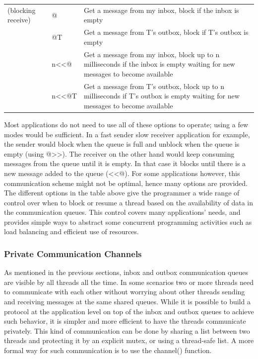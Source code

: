 \begin{flushleft}
\begin{supertabular}{m{0.8920598in}m{0.8643598in}m{4.10186in}}
\centering (blocking receive) &
\centering {\textless}{\textless}@ &
Get a message from my inbox, block if the inbox is empty\\
 &
\centering {\textless}{\textless}@T &
Get a message from T{\textquoteright}s outbox, block if
T{\textquoteright}s outbox is empty\\
 &
\centering n{\textless}{\textless}@ &
Get a message from my inbox, block up to n milliseconds if the inbox is
empty waiting for new messages to become available\\
 &
\centering n{\textless}{\textless}@T &
Get a message from T{\textquoteright}s outbox, block up to n
milliseconds if T{\textquoteright}s outbox is empty waiting for new
messages to become available\\
\end{supertabular}
\end{flushleft}

\bigskip

Most applications do not need to use all of these options to operate;
using a few modes would be sufficient. In a fast sender slow receiver
application for example, the sender would block when the queue is full
and unblock when the queue is empty (using
\textsf{@{\textgreater}{\textgreater}}). The receiver
on the other hand would keep consuming messages from the queue until it
is empty. In that case it blocks until there is a new message added to
the queue (\textsf{{\textless}{\textless}@}). For some
applications however, this communication scheme might not be optimal,
hence many options are provided. The different options in the table
above give the programmer a wide range of control over when to block or
resume a thread based on the availability of data in the communication
queues. This control covers many applications{\textquoteright} needs,
and provides simple ways to abstract some concurrent programming
activities such as load balancing and efficient use of resources.

\subsubsection{Private Communication Channels }

As mentioned in the previous sections, inbox and outbox communication
queues are visible by all threads all the time. In some scenarios two
or more threads need to communicate with each other without worrying
about other threads sending and receiving messages at the same shared
queues. While it is possible to build a protocol at the application
level on top of the inbox and outbox queues to achieve such behavior,
it is simpler and more efficient to have the threads communicate
privately. This kind of communication can be done by sharing a list
between two threads and protecting it by an explicit mutex, or using a
thread-safe list. A more formal way for such communication is to use
the \textsf{channel()} function. 

